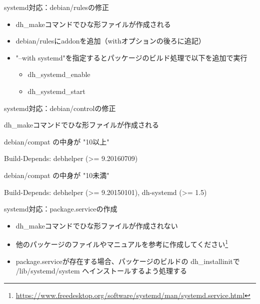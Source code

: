 \begin{frame}[containsverbatim]{systemd対応：debian/rulesの修正}

\begin{itemize}
\item dh\_makeコマンドでひな形ファイルが作成される
\item debian/rulesにaddonを追加（withオプションの後ろに追記）
\end{itemize}

\begin{itemize}
\item "--with systemd"を指定するとパッケージのビルド処理で以下を追加で実行
  \begin{itemize}
  \item dh\_systemd\_enable
  \item dh\_systemd\_start
  \end{itemize}
\end{itemize}

\end{frame}

\begin{frame}[containsverbatim]{systemd対応：debian/controlの修正}

dh\_makeコマンドでひな形ファイルが作成される

debian/compat の中身が "10以上"

\begin{commandline}
Build-Depends: debhelper (>= 9.20160709)
\end{commandline}

debian/compat の中身が "10未満"
\begin{commandline}
Build-Depends: debhelper (>= 9.20150101),
               dh-systemd (>= 1.5)
\end{commandline}
  
\end{frame}

\begin{frame}[containsverbatim]{systemd対応：package.serviceの作成}

  \begin{itemize}
  \item dh\_makeコマンドでひな形ファイルが作成されない
  \item 他のパッケージのファイルやマニュアルを参考に作成してください\footnote{\url{https://www.freedesktop.org/software/systemd/man/systemd.service.html}}
  \item package.serviceが存在する場合、パッケージのビルドの dh\_installinitで /lib/systemd/system へインストールするよう処理する
  \end{itemize}

\end{frame}


